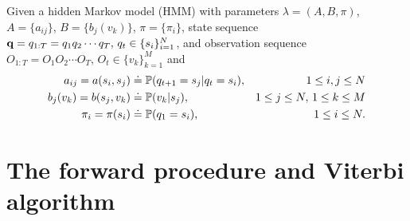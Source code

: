 Given a hidden Markov model (HMM) with parameters $\lambda = (A, B, \pi)$,
$A = \{a_{ij}\}$, $B = \{b_j(v_k)\}$, $\pi = \{\pi_i\}$, 
state sequence $\mathbf{q} = q_{1:T} = q_1 q_2 \cdots q_T, \, q_t \in \{s_i\}_{i=1}^N$,
and observation sequence $O_{1:T} = O_1 O_2 \cdots O_T, \, O_t \in \{v_k\}_{k=1}^M$ and
\begin{equation}
\label{eq:notebasic}
\begin{aligned}
a_{ij} = a(s_i, s_j)   & \doteq \mathbb{P}(q_{t+1} = s_j |q_{t} = s_i), & 1 \le i,j \le N \\
b_j(v_k) = b(s_j, v_k) & \doteq \mathbb{P}(v_k |s_j),                   & 1 \le j \le N, \, 1 \le k \le M   \\
\pi_i = \pi(s_i)       & \doteq \mathbb{P}(q_1 = s_i),                  & 1 \le i \le N.
\end{aligned}
\end{equation}



\section{The forward procedure and Viterbi algorithm}
\label{sec:forward}


